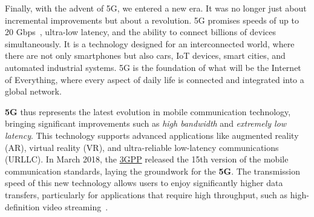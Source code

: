 \documentclass[english]{article}
\begin{document}
Finally, with the advent of 5G, we entered a new era. It was no longer just
about incremental improvements but about a revolution. 5G promises speeds of up
to 20 Gbps~\cite{javid20225g}, ultra-low latency, and the ability to connect
billions of devices simultaneously. It is a technology designed for an
interconnected world, where there are not only smartphones but also cars, IoT
devices, smart cities, and automated industrial systems. 5G is the foundation
of what will be the Internet of Everything, where every aspect of daily life is
connected and integrated into a global network.

\textbf{5G} thus represents the latest evolution in mobile communication
technology, bringing significant improvements such as \textit{high bandwidth}
and \textit{extremely low latency}. This technology supports advanced
applications like augmented reality (AR), virtual reality (VR), and
ultra-reliable low-latency communications (URLLC). In March 2018, the
\href{https://www.3gpp.org/technologies/5g-system-overview}{3GPP} released the
15th version of the mobile communication standards, laying the groundwork for
the \textbf{5G}. The transmission speed of this new technology allows users to
enjoy significantly higher data transfers, particularly for applications that
require high throughput, such as high-definition video
streaming~\cite{javid20225g}.
\end{document}
